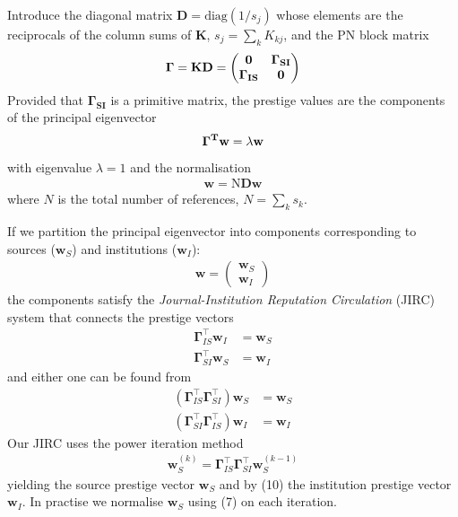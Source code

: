\documentclass[10pt]{article}
\begin{document}
Introduce the diagonal matrix $\mathbf{D} = \text{diag}(1/s_j)$ whose elements are the reciprocals of the column sums of $\mathbf{K}$, $s_j = \sum_k K_{kj}$, and the PN block matrix 
\begin{align}
	\bf{\Gamma} = \mathbf{K}\mathbf{D} = 
	\begin{pmatrix}
		\mathbf{0} & \bf{\Gamma}_{SI} \\
		\bf{\Gamma}_{IS} & \mathbf{0} 
	\end{pmatrix}
\end{align}
Provided that $\mathbf{\Gamma_{SI}}$ is a primitive matrix, the prestige values are the components of the principal eigenvector
\begin{align}
	\bf{\Gamma}^T \mathbf{w} = \lambda \mathbf{w}
\end{align}
with eigenvalue $\lambda = 1$ and the normalisation 
\begin{align}
	\mathbf{w} = \text{N} \mathbf{D} \mathbf{w}  
\end{align}
where $N$ is the total number of references, $N = \sum_k s_k$.

If we partition the principal eigenvector into components corresponding to sources ($\mathbf{w}_S$) and institutions ($\mathbf{w}_I$):
\begin{align}
	\mathbf{w} = 
	\begin{pmatrix}
		\mathbf{w}_S \\
		\mathbf{w}_I
	\end{pmatrix}
\end{align}
the components satisfy the \textit{Journal-Institution Reputation Circulation} (JIRC) system that connects the prestige vectors 
\begin{align}
	\mathbf{\Gamma}_{IS}^\top \mathbf{w}_I &= \mathbf{w}_S \\
	\mathbf{\Gamma}_{SI}^\top \mathbf{w}_S &= \mathbf{w}_I
\end{align}
and either one can be found from
\begin{align}
	(\mathbf{\Gamma}_{IS}^\top \mathbf{\Gamma}_{SI}^\top) \mathbf{w}_S &= \mathbf{w}_S \\
	(\mathbf{\Gamma}_{SI}^\top \mathbf{\Gamma}_{IS}^\top) \mathbf{w}_I &= \mathbf{w}_I
\end{align}
Our JIRC uses the power iteration method
\begin{align}
	\mathbf{w}_S^{(k)} = \mathbf{\Gamma}_{IS}^\top \mathbf{\Gamma}_{SI}^\top \mathbf{w}_S^{(k-1)}
\end{align}
yielding the source prestige vector $\mathbf{w}_S$ and by (10) the institution prestige vector $\mathbf{w}_I$. In practise we normalise $\mathbf{w}_S$ using (7) on each iteration.
\end{document}
